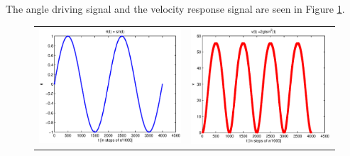 \documentclass[a4paper,11pt]{article}
\begin{document}
The angle driving signal and the velocity response signal are seen in Figure \ref{fig:thetaandv}.
\begin{figure}[ht]
\begin{tabular}{ll}
\includegraphics[scale=0.65]{theta.eps} & \includegraphics[scale=0.65]{v.eps}\\
\end{tabular}
\caption{}
\label{fig:thetaandv}
\end{figure}
\end{document}
